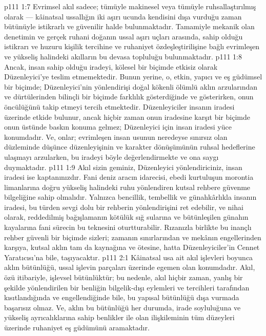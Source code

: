 \vs p111 1:7 Evrimsel akıl sadece; tümüyle makinesel veya tümüyle ruhsallaştırılmış olarak --- kâinatsal ussallığın iki aşırı ucunda kendisini dışa vurduğu zaman bütünüyle istikrarlı ve güvenilir halde bulunmaktadır. Tamamiyle mekanik olan denetimin ve gerçek ruhani doğanın ussal aşırı uçları arasında, sahip olduğu istikrarı ve huzuru kişilik tercihine ve ruhaniyet özdeşleştirilişine bağlı evrimleşen ve yükseliş halindeki akılların bu devasa topluluğu bulunmaktadır.
\vs p111 1:8 Ancak, insan sahip olduğu iradeyi, kölesel bir biçimde etkisiz olarak Düzenleyici’ye teslim etmemektedir. Bunun yerine, o, etkin, yapıcı ve eş güdümsel bir biçimde; Düzenleyici’nin yönlendirişi doğal kökenli ölümlü aklın arzularından ve dürtülerinden bilinçli bir biçimde farklılık gösterdiğinde ve gösterirken, onun öncülüğünü takip etmeyi tercih etmektedir. Düzenleyiciler insanın iradesi üzerinde etkide bulunur, ancak hiçbir zaman onun iradesine karşıt bir biçimde onun üstünde baskın konuma gelmez; Düzenleyici için insan iradesi yüce konumdadır. Ve, onlar; evrimleşen insan usunun neredeyse sınırsız olan düzleminde düşünce düzenleyişinin ve karakter dönüşümünün ruhsal hedeflerine ulaşmayı arzularken, bu iradeyi böyle değerlendirmekte ve ona saygı duymaktadır.
\vs p111 1:9 Akıl sizin geminiz, Düzenleyici yönlendiriciniz, insan iradesi ise kaptanınızdır. Fani deniz aracın idarecisi, ebedi kurtuluşun morontia limanlarına doğru yükseliş halindeki ruhu yönlendiren kutsal rehbere güvenme bilgeliğine sahip olmalıdır. Yalnızca bencillik, tembellik ve günahkârlıkla insanın iradesi, bu türden sevgi dolu bir rehberin yönlendirişini ret edebilir, ve nihai olarak, reddedilmiş bağışlamanın kötülük sığ sularına ve bütünleşilen günahın kayalarına fani sürecin bu teknesini oturtturabilir. Rızanızla birlikte bu inançlı rehber güvenli bir biçimde sizleri; zamanın sınırlarından ve mekânın engellerinden karşıya, kutsal aklın tam da kaynağına ve ötesine, hatta Düzenleyiciler’in Cennet Yaratıcısı’na bile, taşıyacaktır.
\vs p111 2:1 Kâinatsal usa ait akıl işlevleri boyunca aklın bütünlüğü, ussal işlevin parçaları üzerinde egemen olan konumdadır. Akıl, özü itibariyle, işlevsel bütünlüktür; bu nedenle, akıl hiçbir zaman, yanlış bir şekilde yönlendirilen bir benliğin bilgelik\hyp{}dışı eylemleri ve tercihleri tarafından kısıtlandığında ve engellendiğinde bile, bu yapısal bütünlüğü dışa vurmada başarısız olmaz. Ve, aklın bu bütünlüğü her durumda, irade soyluluğuna ve yükseliş ayrıcalıklarına sahip benlikler ile olan ilişkileminin tüm düzeyleri üzerinde ruhaniyet eş güdümünü aramaktadır.
